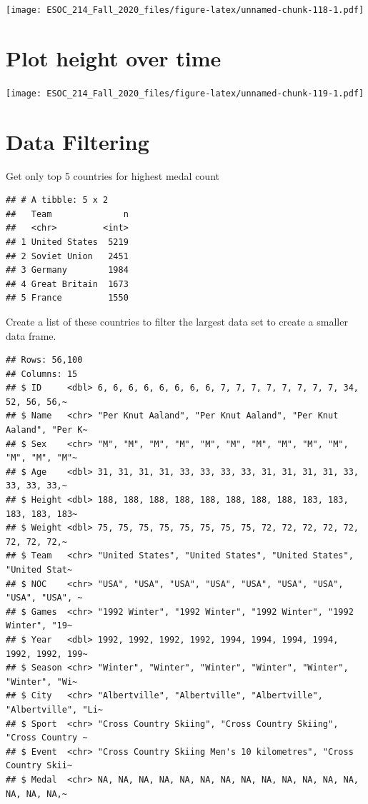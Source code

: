 \documentclass[
]{book}
\begin{document}
\texttt{[image: ESOC\_214\_Fall\_2020\_files/figure-latex/unnamed-chunk-118-1.pdf]}

\hypertarget{plot-height-over-time}{%
\section{Plot height over time}\label{plot-height-over-time}}

\texttt{[image: ESOC\_214\_Fall\_2020\_files/figure-latex/unnamed-chunk-119-1.pdf]}

\hypertarget{data-filtering}{%
\section{Data Filtering}\label{data-filtering}}

Get only top 5 countries for highest medal count

\begin{verbatim}
## # A tibble: 5 x 2
##   Team              n
##   <chr>         <int>
## 1 United States  5219
## 2 Soviet Union   2451
## 3 Germany        1984
## 4 Great Britain  1673
## 5 France         1550
\end{verbatim}

Create a list of these countries to filter the largest data set to create a smaller data frame.

\begin{verbatim}
## Rows: 56,100
## Columns: 15
## $ ID     <dbl> 6, 6, 6, 6, 6, 6, 6, 6, 7, 7, 7, 7, 7, 7, 7, 7, 34, 52, 56, 56,~
## $ Name   <chr> "Per Knut Aaland", "Per Knut Aaland", "Per Knut Aaland", "Per K~
## $ Sex    <chr> "M", "M", "M", "M", "M", "M", "M", "M", "M", "M", "M", "M", "M"~
## $ Age    <dbl> 31, 31, 31, 31, 33, 33, 33, 33, 31, 31, 31, 31, 33, 33, 33, 33,~
## $ Height <dbl> 188, 188, 188, 188, 188, 188, 188, 188, 183, 183, 183, 183, 183~
## $ Weight <dbl> 75, 75, 75, 75, 75, 75, 75, 75, 72, 72, 72, 72, 72, 72, 72, 72,~
## $ Team   <chr> "United States", "United States", "United States", "United Stat~
## $ NOC    <chr> "USA", "USA", "USA", "USA", "USA", "USA", "USA", "USA", "USA", ~
## $ Games  <chr> "1992 Winter", "1992 Winter", "1992 Winter", "1992 Winter", "19~
## $ Year   <dbl> 1992, 1992, 1992, 1992, 1994, 1994, 1994, 1994, 1992, 1992, 199~
## $ Season <chr> "Winter", "Winter", "Winter", "Winter", "Winter", "Winter", "Wi~
## $ City   <chr> "Albertville", "Albertville", "Albertville", "Albertville", "Li~
## $ Sport  <chr> "Cross Country Skiing", "Cross Country Skiing", "Cross Country ~
## $ Event  <chr> "Cross Country Skiing Men's 10 kilometres", "Cross Country Skii~
## $ Medal  <chr> NA, NA, NA, NA, NA, NA, NA, NA, NA, NA, NA, NA, NA, NA, NA, NA,~
\end{verbatim}
\end{document}
